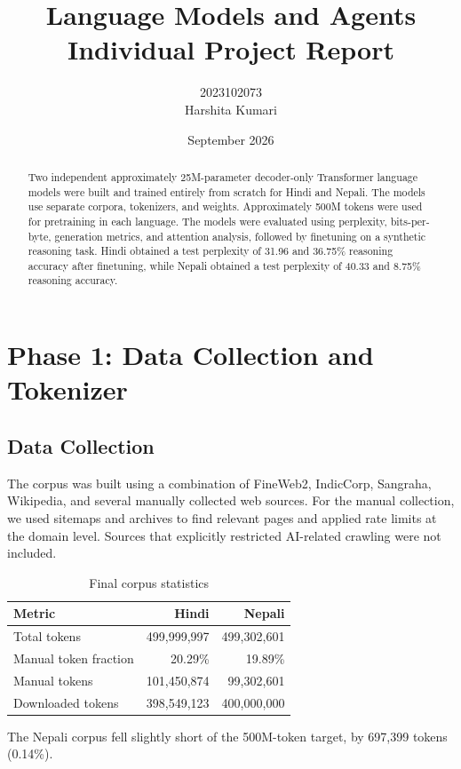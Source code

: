 \documentclass[10pt,a4paper]{article}
\title{\textbf{Language Models and Agents}\\\large Individual Project Report}
\author{2023102073\\Harshita Kumari}
\date{September 2026}
\begin{document}
\maketitle

\begin{abstract}
Two independent approximately 25M-parameter decoder-only Transformer language models were built and trained entirely from scratch for Hindi and Nepali. The models use separate corpora, tokenizers, and weights. Approximately 500M tokens were used for pretraining in each language. The models were evaluated using perplexity, bits-per-byte, generation metrics, and attention analysis, followed by finetuning on a synthetic reasoning task. Hindi obtained a test perplexity of 31.96 and 36.75\% reasoning accuracy after finetuning, while Nepali obtained a test perplexity of 40.33 and 8.75\% reasoning accuracy.
\end{abstract}

\section{Phase 1: Data Collection and Tokenizer}

\subsection{Data Collection}
The corpus was built using a combination of FineWeb2, IndicCorp, Sangraha,
Wikipedia, and several manually collected web sources. For the manual
collection, we used sitemaps and archives to find relevant pages and
applied rate limits at the domain level. Sources that explicitly
restricted AI-related crawling were not included.

\begin{table}[H]\centering
\caption{Final corpus statistics}
\small
\begin{tabular}{lrr}\toprule
Metric & Hindi & Nepali\\\midrule
Total tokens & 499,999,997 & 499,302,601\\
Manual token fraction & 20.29\% & 19.89\%\\
Manual tokens & 101,450,874 & 99,302,601\\
Downloaded tokens & 398,549,123 & 400,000,000\\
\bottomrule\end{tabular}
\end{table}

The Nepali corpus fell slightly short of the 500M-token target, by
697,399 tokens (0.14\%).
\end{document}
